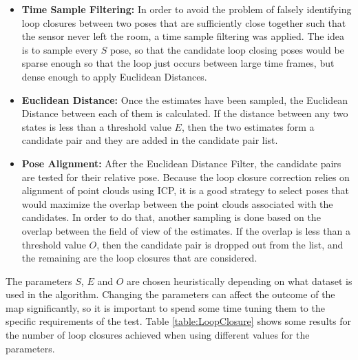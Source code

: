 \documentclass[11pt]{article}
\begin{document}
\begin{itemize}
\item \textbf{Time Sample Filtering:} In order to avoid the problem of falsely identifying loop closures between two poses that are sufficiently close together such that the sensor never left the room, a time sample filtering was applied. The idea is to sample every $S$ pose, so that the candidate loop closing poses would be sparse enough so that the loop just occurs between large time frames, but dense enough to apply Euclidean Distances.
\item \textbf{Euclidean Distance:} Once the estimates have been  sampled, the Euclidean Distance between each of them is calculated. If the distance between any two states is less than a threshold value $E$, then the two estimates form a candidate pair and they are added in the candidate pair list.
\item \textbf{Pose Alignment:} After the Euclidean Distance Filter, the candidate pairs are tested for their relative pose. Because the loop closure correction relies on alignment of point clouds using ICP, it is a good strategy to select poses that would maximize the overlap between the point clouds associated with the candidates. In order to do that, another sampling is done based on the overlap between the field of view of the estimates. If the overlap is less than a threshold value $O$, then the candidate pair is dropped out from the list, and the remaining are the loop closures that are considered.
\end{itemize}
	
The parameters $S$, $E$ and $O$ are chosen heuristically depending on what dataset is used in the algorithm. Changing the parameters can affect the outcome of the map significantly, so it is important to spend some time tuning them to the specific requirements of the test. Table \ref{table:LoopClosure} shows some results for the number of loop closures achieved when using different values for the parameters.
\end{document}
